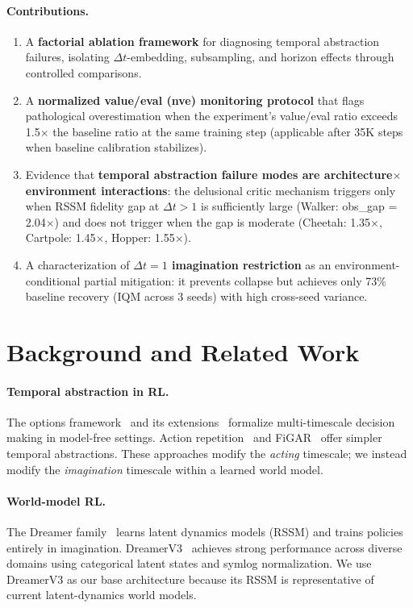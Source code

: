 \documentclass[10pt,letterpaper]{article}
\begin{document}
\paragraph{Contributions.}
\begin{enumerate}
    \item A \textbf{factorial ablation framework} for diagnosing temporal abstraction failures, isolating $\Delta t$-embedding, subsampling, and horizon effects through controlled comparisons.
    \item A \textbf{normalized value/eval (nve) monitoring protocol} that flags pathological overestimation when the experiment's value/eval ratio exceeds 1.5$\times$ the baseline ratio at the same training step (applicable after 35K steps when baseline calibration stabilizes).
    \item Evidence that \textbf{temporal abstraction failure modes are architecture$\times$environment interactions}: the delusional critic mechanism triggers only when RSSM fidelity gap at $\Delta t{>}1$ is sufficiently large (Walker: obs\_gap = 2.04$\times$) and does not trigger when the gap is moderate (Cheetah: 1.35$\times$, Cartpole: 1.45$\times$, Hopper: 1.55$\times$).
    \item A characterization of \textbf{$\Delta t{=}1$ imagination restriction} as an environment-conditional partial mitigation: it prevents collapse but achieves only 73\% baseline recovery (IQM across 3 seeds) with high cross-seed variance.
\end{enumerate}

\section{Background and Related Work}
\label{sec:background}

\paragraph{Temporal abstraction in RL.}
The options framework~\citep{sutton1999between} and its extensions~\citep{bacon2017option,harb2018when} formalize multi-timescale decision making in model-free settings. Action repetition~\citep{lakshminarayanan2017dynamic} and FiGAR~\citep{sharma2017learning} offer simpler temporal abstractions. These approaches modify the \emph{acting} timescale; we instead modify the \emph{imagination} timescale within a learned world model.

\paragraph{World-model RL.}
The Dreamer family~\citep{hafner2020dream,hafner2021mastering,hafner2023mastering} learns latent dynamics models (RSSM) and trains policies entirely in imagination. DreamerV3~\citep{hafner2023mastering} achieves strong performance across diverse domains using categorical latent states and symlog normalization. We use DreamerV3 as our base architecture because its RSSM is representative of current latent-dynamics world models.
\end{document}
